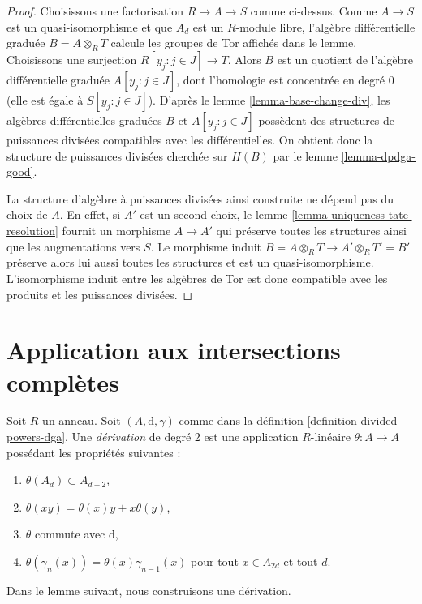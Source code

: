 \begin{proof}
Choisissons une factorisation $R \to A \to S$ comme ci-dessus. Comme $A \to S$
est un quasi-isomorphisme et que $A_d$ est un $R$-module
libre, l'algèbre différentielle graduée $B = A \otimes_R T$ calcule
les groupes de Tor affichés dans le lemme. Choisissons une surjection
$R[y_j:j\in J] \to T$. Alors
$B$ est un quotient de l'algèbre différentielle graduée
$A[y_j:j\in J]$, dont l'homologie est concentrée en degré $0$ (elle est
égale à $S[y_j:j\in J]$).
D'après le lemme \ref{lemma-base-change-div}, les algèbres différentielles graduées $B$ et
$A[y_j:j\in J]$ possèdent des structures de puissances divisées
compatibles avec les différentielles. On obtient donc la structure de
puissances divisées cherchée sur $H(B)$ par le lemme \ref{lemma-dpdga-good}.

\medskip\noindent
La structure d'algèbre à puissances divisées ainsi construite ne dépend
pas du choix de $A$. En effet, si $A'$ est un second choix, le
lemme \ref{lemma-uniqueness-tate-resolution}
fournit un morphisme $A \to A'$ qui préserve toutes les structures ainsi
que les augmentations vers $S$. Le morphisme induit
$B = A \otimes_R T \to A' \otimes_R T' = B'$ préserve alors
lui aussi toutes les
structures et est un quasi-isomorphisme. L'isomorphisme induit entre
les algèbres de Tor est donc compatible avec les produits et
les puissances divisées.
\end{proof}





\section{Application aux intersections complètes}
\label{section-application-ci}

\noindent
Soit $R$ un anneau. Soit $(A, \text{d}, \gamma)$ comme dans
la définition \ref{definition-divided-powers-dga}.
Une {\it dérivation} de degré $2$ est une application $R$-linéaire
$\theta : A \to A$ possédant les
propriétés suivantes :
\begin{enumerate}
\item $\theta(A_d) \subset A_{d - 2}$,
\item $\theta(xy) = \theta(x)y + x\theta(y)$,
\item $\theta$ commute avec $\text{d}$,
\item $\theta(\gamma_n(x)) = \theta(x) \gamma_{n - 1}(x)$
pour tout $x \in A_{2d}$ et tout $d$.
\end{enumerate}
Dans le lemme suivant, nous construisons une dérivation.

